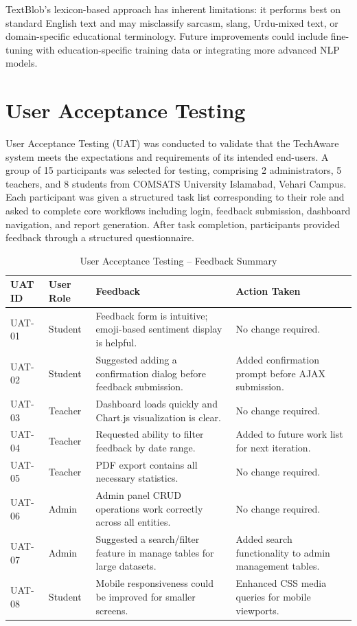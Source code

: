 TextBlob's lexicon-based approach has inherent limitations: it performs best on standard English text and may misclassify sarcasm, slang, Urdu-mixed text, or domain-specific educational terminology. Future improvements could include fine-tuning with education-specific training data or integrating more advanced NLP models.


\section{User Acceptance Testing}

User Acceptance Testing (UAT) was conducted to validate that the TechAware system meets the expectations and requirements of its intended end-users. A group of 15 participants was selected for testing, comprising 2 administrators, 5 teachers, and 8 students from COMSATS University Islamabad, Vehari Campus. Each participant was given a structured task list corresponding to their role and asked to complete core workflows including login, feedback submission, dashboard navigation, and report generation. After task completion, participants provided feedback through a structured questionnaire.

\begin{table}[H]
\centering
\caption{User Acceptance Testing -- Feedback Summary}
\begin{tabularx}{\textwidth}{|p{1.5cm}|p{2.5cm}|X|X|}
\hline
\textbf{UAT ID} & \textbf{User Role} & \textbf{Feedback} & \textbf{Action Taken} \\
\hline
UAT-01 & Student & Feedback form is intuitive; emoji-based sentiment display is helpful. & No change required. \\
\hline
UAT-02 & Student & Suggested adding a confirmation dialog before feedback submission. & Added confirmation prompt before AJAX submission. \\
\hline
UAT-03 & Teacher & Dashboard loads quickly and Chart.js visualization is clear. & No change required. \\
\hline
UAT-04 & Teacher & Requested ability to filter feedback by date range. & Added to future work list for next iteration. \\
\hline
UAT-05 & Teacher & PDF export contains all necessary statistics. & No change required. \\
\hline
UAT-06 & Admin & Admin panel CRUD operations work correctly across all entities. & No change required. \\
\hline
UAT-07 & Admin & Suggested a search/filter feature in manage tables for large datasets. & Added search functionality to admin management tables. \\
\hline
UAT-08 & Student & Mobile responsiveness could be improved for smaller screens. & Enhanced CSS media queries for mobile viewports. \\
\hline
\end{tabularx}
\end{table}

